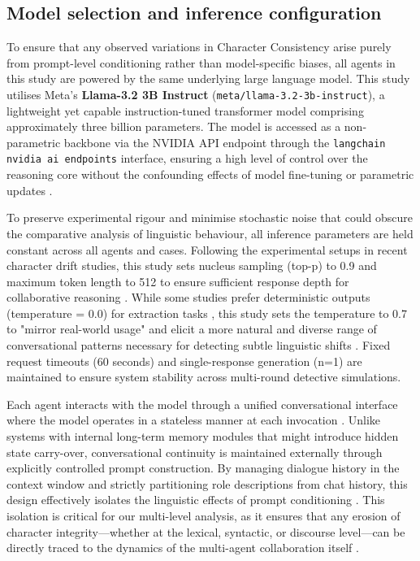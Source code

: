 \documentclass{article}
\begin{document}
\subsection{Model selection and inference configuration}

To ensure that any observed variations in Character Consistency arise purely from prompt-level conditioning rather than model-specific biases, all agents in this study are powered by the same underlying large language model. This study utilises Meta’s \textbf{Llama-3.2 3B Instruct} (\texttt{meta/llama-3.2-3b-instruct}), a lightweight yet capable instruction-tuned transformer model comprising approximately three billion parameters. The model is accessed as a non-parametric backbone via the NVIDIA API endpoint through the \texttt{langchain nvidia ai endpoints} interface, ensuring a high level of control over the reasoning core without the confounding effects of model fine-tuning or parametric updates
\citep{shao2023characterllm}.

To preserve experimental rigour and minimise stochastic noise that could obscure the comparative analysis of linguistic behaviour, all inference parameters are held constant across all agents and cases. Following the experimental setups in recent character drift studies, this study sets nucleus sampling (top-p) to 0.9 and maximum token length to 512 to ensure sufficient response depth for collaborative reasoning \citep{choi2024examining}. While some studies prefer deterministic outputs (temperature = 0.0) for extraction tasks \citep{delima2025detective}, this study sets the temperature to 0.7 to "mirror real-world usage" and elicit a more natural and diverse range of conversational patterns necessary for detecting subtle linguistic shifts \citep{choi2024examining}. Fixed request timeouts (60 seconds) and single-response generation (n=1) are maintained to ensure system stability across multi-round detective simulations.

Each agent interacts with the model through a unified conversational interface where the model operates in a stateless manner at each invocation \citep{park2023generative, guo2026collab}
. Unlike systems with internal long-term memory modules that might introduce hidden state carry-over, conversational continuity is maintained externally through explicitly controlled prompt construction. By managing dialogue history in the context window and strictly partitioning role descriptions from chat history, this design effectively isolates the linguistic effects of prompt conditioning \citep{delima2025detective}. This isolation is critical for our multi-level analysis, as it ensures that any erosion of character integrity—whether at the lexical, syntactic, or discourse level—can be directly traced to the dynamics of the multi-agent collaboration itself \citep{choi2024examining, guo2026collab}.
\end{document}
